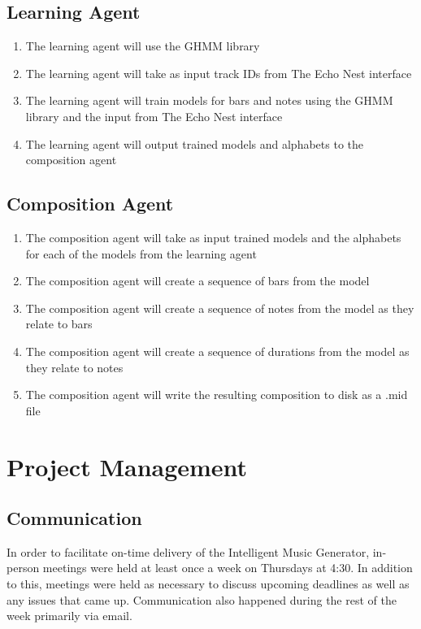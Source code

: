 \documentclass{article}
\begin{document}
\subsection{Learning Agent}
  \begin{enumerate}
  \item The learning agent will use the GHMM library
  \item The learning agent will take as input track IDs from The Echo Nest interface
  \item The learning agent will train models for bars and notes using the GHMM library and the input from The Echo Nest interface
  \item The learning agent will output trained models and alphabets to the composition agent
 \end{enumerate}

\subsection{Composition Agent}
 \begin{enumerate}
 \item The composition agent will take as input trained models and the alphabets for each of the models from the learning agent
 \item The composition agent will create a sequence of bars from the model
 \item The composition agent will create a sequence of notes from the model as they relate to bars
 \item The composition agent will create a sequence of durations from the model as they relate to notes
 \item The composition agent will write the resulting composition to disk as a .mid file
 \end{enumerate}

\section{Project Management}
\subsection{Communication}
 In order to facilitate on-time delivery of the Intelligent Music Generator, in-person meetings
 were held at least once a week on Thursdays at 4:30. In addition to this, meetings were
 held as necessary to discuss upcoming deadlines as well as any issues that came up.
 Communication also happened during the rest of the week primarily via email.
\end{document}
